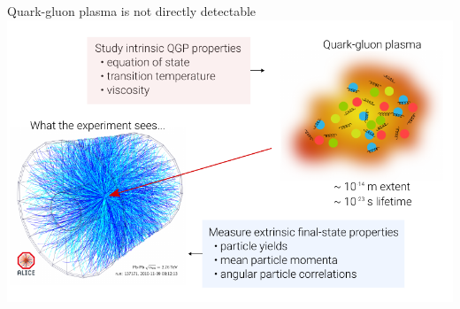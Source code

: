 \documentclass[xcolor=dvipsnames, aspectratio=169]{beamer}
\begin{document}
\begin{frame}{Quark-gluon plasma is not directly detectable}
    \medskip
    \centering
    \includegraphics[height=0.85\textheight]{qgp_modeling}
\end{frame}
\end{document}
